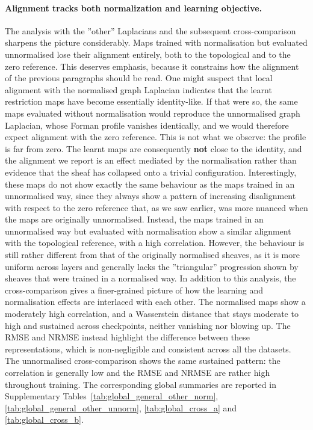 \paragraph{Alignment tracks both normalization and learning objective.}
The analysis with the ''other'' Laplacians and the subsequent cross-comparison sharpens the picture considerably. 
Maps trained with normalisation but evaluated unnormalised lose their alignment entirely, both to the topological and to the zero reference.
This deserves emphasis, because it constrains how the alignment of the previous paragraphs should be read.
One might suspect that local alignment with the normalised graph Laplacian indicates that the learnt restriction maps have become essentially identity-like.
If that were so, the same maps evaluated without normalisation would reproduce the unnormalised graph Laplacian, whose Forman profile vanishes identically, and we would therefore expect alignment with the zero reference.
This is not what we observe: the profile is far from zero.
The learnt maps are consequently \textbf{not} close to the identity, and the alignment we report is an effect mediated by the normalisation rather than evidence that the sheaf has collapsed onto a trivial configuration.
Interestingly, these maps do not show exactly the same behaviour as the maps trained in an unnormalised way, since they always show a pattern of increasing disalignment with respect to the zero reference that, as we saw earlier, was more nuanced when the maps are originally unnormalised.
Instead, the maps trained in an unnormalised way but evaluated with normalisation show a similar alignment with the topological reference, with a high correlation.
However, the behaviour is still rather different from that of the originally normalised sheaves, as it is more uniform across layers and generally lacks the ''triangular'' progression shown by sheaves that were trained in a normalised way.
In addition to this analysis, the cross-comparison gives a finer-grained picture of how the learning and normalisation effects are interlaced with each other.
The normalised maps show a moderately high correlation, and a Wasserstein distance that stays moderate to high and sustained across checkpoints, neither vanishing nor blowing up.
The RMSE and NRMSE instead highlight the difference between these representations, which is non-negligible and consistent across all the datasets.
The unnormalised cross-comparison shows the same sustained pattern: the correlation is generally low and the RMSE and NRMSE are rather high throughout training.
The corresponding global summaries are reported in Supplementary Tables~\ref{tab:global_general_other_norm}, \ref{tab:global_general_other_unnorm}, \ref{tab:global_cross_a} and \ref{tab:global_cross_b}.
